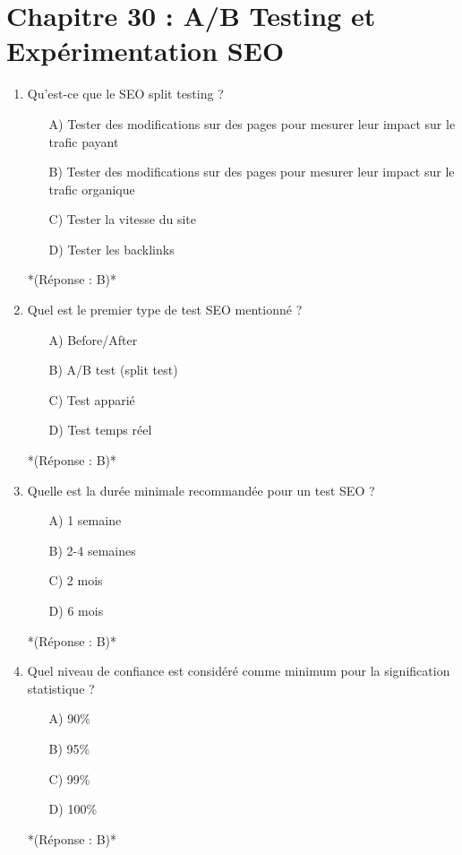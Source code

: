 \documentclass[12pt,a4paper,twoside]{report}
\begin{document}
\section*{Chapitre 30 : A/B Testing et Expérimentation SEO}
\begin{enumerate}
    \item Qu'est-ce que le SEO split testing ?
    \begin{itemize}
        \item[A)] Tester des modifications sur des pages pour mesurer leur impact sur le trafic payant
        \item[B)] Tester des modifications sur des pages pour mesurer leur impact sur le trafic organique
        \item[C)] Tester la vitesse du site
        \item[D)] Tester les backlinks
    \end{itemize}
    *(Réponse : B)*

    \item Quel est le premier type de test SEO mentionné ?
    \begin{itemize}
        \item[A)] Before/After
        \item[B)] A/B test (split test)
        \item[C)] Test apparié
        \item[D)] Test temps réel
    \end{itemize}
    *(Réponse : B)*

    \item Quelle est la durée minimale recommandée pour un test SEO ?
    \begin{itemize}
        \item[A)] 1 semaine
        \item[B)] 2-4 semaines
        \item[C)] 2 mois
        \item[D)] 6 mois
    \end{itemize}
    *(Réponse : B)*

    \item Quel niveau de confiance est considéré comme minimum pour la signification statistique ?
    \begin{itemize}
        \item[A)] 90\%
        \item[B)] 95\%
        \item[C)] 99\%
        \item[D)] 100\%
    \end{itemize}
    *(Réponse : B)*


\end{enumerate}
\end{document}
